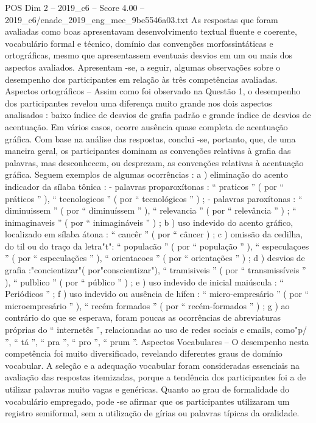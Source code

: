 \begin{textsample}{POS Dim 2 – 2019\_c6 – Score 4.00 – 2019\_c6/enade\_2019\_eng\_mec\_9be5546a03.txt}
As respostas que foram avaliadas como boas apresentavam desenvolvimento textual fluente e coerente, vocabulário formal e técnico, domínio das convenções morfossintáticas e ortográficas, mesmo que apresentassem eventuais desvios em um ou mais dos aspectos avaliados.
Apresentam -se, a seguir, algumas observações sobre o desempenho dos participantes em relação às três competências avaliadas.
Aspectos ortográficos – Assim como foi observado na Questão 1, o desempenho dos participantes revelou uma diferença muito grande nos dois aspectos analisados : baixo índice de desvios de grafia padrão e grande índice de desvios de acentuação.
Em vários casos, ocorre ausência quase completa de acentuação gráfica.
Com base na análise das respostas, conclui -se, portanto, que, de uma maneira geral, os participantes dominam as convenções relativas à grafia das palavras, mas desconhecem, ou desprezam, as convenções relativas à acentuação gráfica.
Seguem exemplos de algumas ocorrências : a ) eliminação do acento indicador da sílaba tônica : - palavras proparoxítonas : “ praticos ” ( por “ práticos ” ), “ tecnologicos ” ( por “ tecnológicos ” ) ; - palavras paroxítonas : “ diminuissem ” ( por “ diminuíssem ” ), “ relevancia ” ( por “ relevância ” ) ; “ inimaginaveis ” ( por “ inimagináveis ” ) ; b ) uso indevido do acento gráfico, localizado em sílaba átona : “ cancêr ” ( por “ câncer ) ; c ) omissão da cedilha, do til ou do traço da letra"t": “ populacão ” ( por “ população ” ), “ especulaçoes ” ( por “ especulações ” ), “ orientacoes ” ( por “ orientações ” ) ; d ) desvios de grafia :"concientizar"( por"conscientizar"), “ tramisiveis ” ( por “ transmissíveis ” ), “ pulblico ” ( por “ público ” ) ; e ) uso indevido de inicial maiúscula : “ Periódicos ” ; f ) uso indevido ou ausência de hífen : “ micro-empresário ” ( por “ microempresário ” ), “ recém formados ” ( por “ recém-formados ” ) ; g ) ao contrário do que se esperava, foram poucas as ocorrências de abreviaturas próprias do “ internetês ”, relacionadas ao uso de redes sociais e emails, como"p/ ”, “ tá ”, “ pra ”, “ pro ”, “ prum ”.
Aspectos Vocabulares – O desempenho nesta competência foi muito diversificado, revelando diferentes graus de domínio vocabular.
A seleção e a adequação vocabular foram consideradas essenciais na avaliação das respostas itemizadas, porque a tendência dos participantes foi a de utilizar palavras muito vagas e genéricas.
Quanto ao grau de formalidade do vocabulário empregado, pode -se afirmar que os participantes utilizaram um registro semiformal, sem a utilização de gírias ou palavras típicas da oralidade.

\end{textsample}
